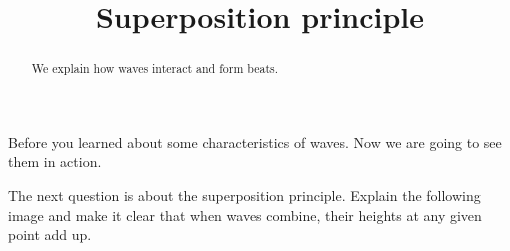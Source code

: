 \documentclass[12pt,noauthor,nooutcomes, instructornotes]{ximera}
\author{}
\title{Superposition principle}
\begin{document}
\begin{abstract}
    We explain how waves interact and form beats.
\end{abstract}
\maketitle




Before you learned about some characteristics of waves. Now we are going to see them in action.









    



\begin{instructorNotes}
The next question is about the superposition principle. Explain the following image and make it clear that when waves combine, their heights at any given point add up.
\end{instructorNotes}
\end{document}
